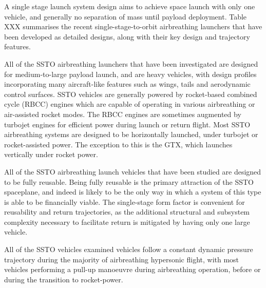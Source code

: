 A single stage launch system design aims to achieve space launch with only one vehicle, and generally no separation of mass until payload deployment. Table XXX summarises the recent single-stage-to-orbit airbreathing launchers that have been developed as detailed designs, along with their key design and trajectory features. 

All of the SSTO airbreathing launchers that have been investigated are designed for medium-to-large payload launch, and are heavy vehicles, with design profiles incorporating many aircraft-like features such as wings, tails and aerodynamic control surfaces. 
SSTO vehicles are generally powered by rocket-based combined cycle (RBCC) engines which are capable of operating in various airbreathing or air-assisted rocket modes. The RBCC engines are sometimes augmented by turbojet engines for efficient power during launch or return flight. 
Most SSTO airbreathing systems are designed to be horizontally launched, under turbojet or rocket-assisted power. The exception to this is the GTX, which launches vertically under rocket power. 

All of the SSTO airbreathing launch vehicles that have been studied are designed to be fully reusable. Being fully reusable is the primary attraction of the SSTO spaceplane, and indeed is likely to be the only way in which a system of this type is able to be financially viable. 
The single-stage form factor is convenient for reusability and return trajectories, as the additional structural and subsystem complexity necessary to facilitate return is mitigated by having only one large vehicle.   

All of the SSTO vehicles examined vehicles follow a constant dynamic pressure trajectory during the majority of airbreathing hypersonic flight, with most vehicles performing a pull-up manoeuvre during airbreathing operation, before or during the transition to rocket-power. 

